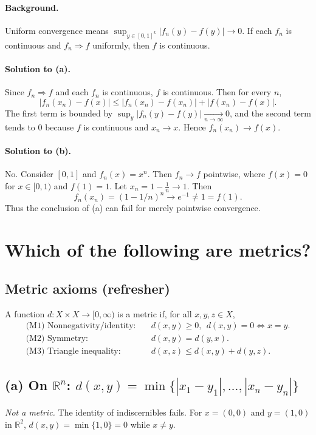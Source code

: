 \documentclass[12pt,a4paper]{article}
\begin{document}
\paragraph{Background.}
Uniform convergence means $\sup_{y\in[0,1]^k}|f_n(y)-f(y)|\to 0$. If each $f_n$ is continuous and $f_n\Rightarrow f$ uniformly, then $f$ is continuous.

\paragraph{Solution to (a).}
Since $f_n\Rightarrow f$ and each $f_n$ is continuous, $f$ is continuous. Then for every $n$,
\[
|f_n(x_n)-f(x)|
\le |f_n(x_n)-f(x_n)| + |f(x_n)-f(x)|.
\]
The first term is bounded by $\sup_{y}|f_n(y)-f(y)|\xrightarrow[n\to\infty]{}0$, and the second term tends to $0$ because $f$ is continuous and $x_n\to x$. Hence $f_n(x_n)\to f(x)$.

\paragraph{Solution to (b).}
No. Consider $[0,1]$ and $f_n(x)=x^n$. Then $f_n\to f$ pointwise, where $f(x)=0$ for $x\in[0,1)$ and $f(1)=1$. Let $x_n=1-\tfrac1n\to 1$. Then
\[
f_n(x_n)=(1-1/n)^n \longrightarrow e^{-1}\neq 1=f(1).
\]
Thus the conclusion of (a) can fail for merely pointwise convergence.

\section*{Which of the following are metrics?}

\subsection*{Metric axioms (refresher)}
A function $d:X\times X\to[0,\infty)$ is a metric if, for all $x,y,z\in X$,
\begin{align*}
\text{(M1) Nonnegativity/identity:}\quad& d(x,y)\ge0,\ \ d(x,y)=0 \iff x=y.\\[0.35em]
\text{(M2) Symmetry:}\quad& d(x,y)=d(y,x).\\[0.35em]
\text{(M3) Triangle inequality:}\quad& d(x,z)\le d(x,y)+d(y,z).
\end{align*}

\subsection*{(a) On $\mathbb{R}^n$: $d(x,y)=\min\{|x_1-y_1|,\ldots,|x_n-y_n|\}$}
\emph{Not a metric.} The identity of indiscernibles fails. For $x=(0,0)$ and $y=(1,0)$ in $\mathbb{R}^2$,
$d(x,y)=\min\{1,0\}=0$ while $x\ne y$.
\end{document}

